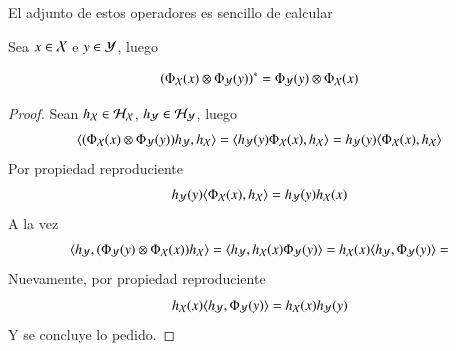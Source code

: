 	El adjunto de estos operadores es sencillo de calcular
	\begin{prop}
		Sea $x \in \mathcal{X}$ e $y \in \mathcal{Y}$, luego
		
		\begin{equation*}
			\left ( \Phi_{\mathcal{X}} (x) \otimes \Phi_{\mathcal{Y}} (y) \right )^* = \Phi_{\mathcal{Y}} (y) \otimes \Phi_{\mathcal{X}} (x)
		\end{equation*}
	\end{prop}
	\begin{proof}
		Sean $h_{\mathcal{X}} \in \mathcal{H}_{\mathcal{X}}$, $h_{\mathcal{Y}} \in \mathcal{H}_{\mathcal{Y}}$, luego
		\begin{equation*}
			\langle (\Phi_{\mathcal{X}} (x) \otimes \Phi_{\mathcal{Y}} (y)) h_{\mathcal{Y}}, h_{\mathcal{X}} \rangle = \langle h_{\mathcal{Y}} (y) \Phi_{\mathcal{X}} (x), h_{\mathcal{X}} \rangle = h_{\mathcal{Y}} (y) \langle \Phi_{\mathcal{X}} (x), h_{\mathcal{X}} \rangle
		\end{equation*}
		Por propiedad reproduciente
		\begin{equation*}
			h_{\mathcal{Y}} (y) \langle  \Phi_{\mathcal{X}} (x), h_{\mathcal{X}} \rangle = h_{\mathcal{Y}} (y) h_{\mathcal{X}} (x)
		\end{equation*}
		A la vez
		\begin{equation*}
			\langle h_{\mathcal{Y}}, (\Phi_{\mathcal{Y}} (y) \otimes \Phi_{\mathcal{X}} (x)) h_{\mathcal{X}} \rangle = \langle h_{\mathcal{Y}}, h_{\mathcal{X}} (x) \Phi_{\mathcal{Y}} (y) \rangle = h_{\mathcal{X}} (x) 
			\langle h_{\mathcal{Y}}, \Phi_{\mathcal{Y}} (y) \rangle =
		\end{equation*}
		Nuevamente, por propiedad reproduciente
		\begin{equation*}
			h_{\mathcal{X}} (x) 
			\langle h_{\mathcal{Y}}, \Phi_{\mathcal{Y}} (y) \rangle =h_{\mathcal{X}} (x) h_{\mathcal{Y}} (y) 
		\end{equation*}
		Y se concluye lo pedido.
	\end{proof}
	
